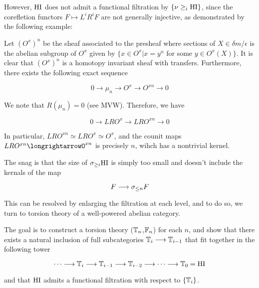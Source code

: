 However, $\mathrm{HI}$ does not admit a functional filtration by $\{\nu \geq_{i} \mathrm{HI}\}$, since the corefletion functors 
$F \mapsto L^iR^iF$ are not generally injective, as demonstrated by the following example:

\begin{ex}
Let $(O^x)^n$ be the sheaf associated to the presheaf where sections of $X \in \delta m /\epsilon$ is the abelian subgroup of $O^x$ given by $\{x \in O^x | x=y^n$ for some $y \in O^x(X)\}$. It is clear that $(O^x)^n$ is a homotopy invariant sheaf with 
transfers. Furthermore, there exists the following exact sequence

\begin{equation}
0 \longrightarrow \mu_n \longrightarrow O^x \longrightarrow O^{xn} \longrightarrow 0
\end{equation}

We note that $R(\mu_n) = 0$ (see MVW). Therefore, we have

\begin{equation}
0 \longrightarrow LRO^x \longrightarrow LRO^{xn} \longrightarrow 0
\end{equation}

In particular, $LRO^{xn} \simeq LRO^x \simeq O^x$, and the counit maps $LRO^{xn} \longrightarrowO^{xn}$
is precisely $n$, wihch has a nontrivial kernel.

The snag is that the size of $\sigma_{\geq i} \mathrm{HI}$ is simply too small and doesn't include the kernals of the map

\begin{equation}
F \longrightarrow \sigma_{\leq n} F
\end{equation}

This can be resolved by enlarging the filtration at each level, and to do so, we turn to torsion theory of a well-powered abelian category.
\end{ex}

The goal is to construct a torsion theory ($\mathbb{T}_n$,$\mathbb{F}_n$) for each $n$, and show that there exists 
a natural inclusion of full subcategories $\mathbb{T}_i \longrightarrow \mathbb{T}_{i-1}$ that fit together in the following tower

\begin{equation}
\cdots \longrightarrow \mathbb{T}_i \longrightarrow \mathbb{T}_{i-1} \longrightarrow \mathbb{T}_{i-2} \longrightarrow
\cdots \longrightarrow \mathbb{T}_0 = \mathrm{HI}
\end{equation}

and that $\mathrm{HI}$ admits a functional filtration with respect to $\{\mathbb{T}_i\}$.

